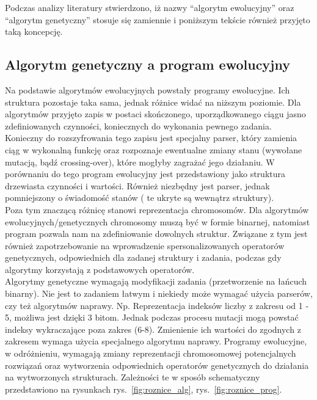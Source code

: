 \documentclass[twoside,a4paper,10]{book}
\begin{document}
Podczas  analizy literatury stwierdzono, iż nazwy “algorytm ewolucyjny”  oraz “algorytm  genetyczny” stosuje się zamiennie i  poniższym tekście również przyjęto taką koncepcję. 

\subsection{ Algorytm genetyczny a program ewolucyjny}
 Na podstawie algorytmów ewolucyjnych powstały programy ewolucyjne. Ich struktura pozostaje taka sama, jednak różnice widać na niższym poziomie. 
Dla algorytmów przyjęto zapis w postaci skończonego, uporządkowanego ciągu  jasno zdefiniowanych czynności, koniecznych do wykonania pewnego zadania. Konieczny do rozszyfrowania tego zapisu jest specjalny parser, który zamienia ciąg w wykonalną funkcję oraz rozpoznaje ewentualne zmiany stanu (wywołane mutacją, bądź crossing-over), które mogłyby zagrażać jego działaniu.  W porównaniu do tego program ewolucyjny jest przedstawiony jako struktura drzewiasta czynności i wartości. Również niezbędny jest parser, jednak pomniejszony o świadomość stanów ( te ukryte są wewnątrz struktury). 
\\
Poza tym znaczącą różnicę stanowi reprezentacja chromosomów. Dla algorytmów ewolucyjnych/genetycznych chromosomy muszą być w formie binarnej, natomiast program pozwala nam na zdefiniowanie dowolnych struktur.
Związane z tym jest również zapotrzebowanie na wprowadzenie spersonalizowanych operatorów genetycznych, odpowiednich dla zadanej struktury i zadania, podczas gdy algorytmy korzystają z podstawowych operatorów.
\\
Algorytmy genetyczne wymagają modyfikacji zadania (przetworzenie na łańcuch binarny). Nie jest to zadaniem łatwym i niekiedy może wymagać użycia parserów, czy też algorytmów naprawy. Np. Reprezentacja indeksów liczby z zakresu od 1 - 5, możliwa jest dzięki 3 bitom. Jednak podczas procesu mutacji mogą powstać indeksy wykraczające poza zakres (6-8). Zmienienie ich wartości do zgodnych z zakresem wymaga użycia specjalnego algorytmu naprawy. 
Programy ewolucyjne, w odróżnieniu,  wymagają zmiany reprezentacji chromosomowej potencjalnych rozwiązań oraz wytworzenia odpowiednich operatorów genetycznych do działania na wytworzonych strukturach.  Zależności te w sposób schematyczny przedstawiono na rysunkach rys.~\ref{fig:roznice_alg}, rys.~\ref{fig:roznice_prog}.
\end{document}

